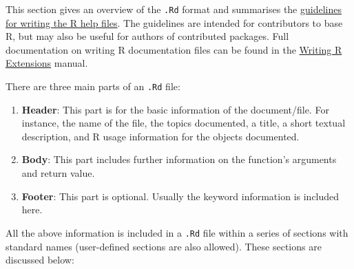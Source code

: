 \documentclass[
]{book}
\begin{document}
This section gives an overview of the \texttt{.Rd} format and summarises the \href{https://developer.r-project.org/Rds.html}{guidelines for writing the R help files}. The guidelines are intended for contributors to base R, but may also be useful for authors of contributed packages. Full documentation on writing R documentation files can be found in the \href{https://cran.r-project.org/doc/manuals/r-release/R-exts.html\#Writing-R-documentation-files}{Writing R Extensions} manual.

There are three main parts of an \texttt{.Rd} file:

\begin{enumerate}
\def\labelenumi{\arabic{enumi}.}
\item
  \textbf{Header}: This part is for the basic information of the document/file. For instance, the name of the file, the topics documented, a title, a short textual description, and R usage information for the objects documented.
\item
  \textbf{Body}: This part includes further information on the function's arguments and return value.
\item
  \textbf{Footer}: This part is optional. Usually the keyword information is included here.
\end{enumerate}

All the above information is included in a \texttt{.Rd} file within a series of sections with standard names (user-defined sections are also allowed). These sections are discussed below:
\end{document}
